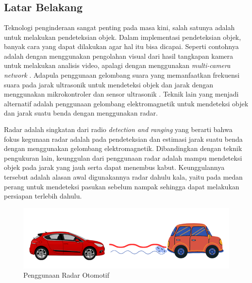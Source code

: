 \chapter{\babSatu}
\section{Latar Belakang}
Teknologi penginderaan sangat penting pada masa kini, salah satunya adalah untuk melakukan pendeteksian objek. Dalam implementasi pendeteksian objek, banyak cara yang dapat dilakukan agar hal itu bisa dicapai. Seperti contohnya adalah dengan menggunakan pengolahan visual dari hasil tangkapan kamera untuk melakukan analisis video, apalagi dengan menggunakan \textit{multi-camera network} \cite{Zhang2015}. Adapula penggunaan gelombang suara yang memanfaatkan frekuensi suara pada jarak ultrasonik untuk mendeteksi objek dan jarak dengan menggunakan mikrokontroler dan sensor ultrasonik \cite{Biswas2020}. Teknik lain yang menjadi alternatif adalah penggunaan gelombang elektromagnetik untuk mendeteksi objek dan jarak suatu benda dengan menggunakan radar. 

Radar adalah singkatan dari radio \textit{detection and ranging} yang berarti bahwa fokus kegunaan radar adalah pada pendeteksian dan estimasi jarak suatu benda dengan menggunakan gelombang elektromagnetik. Dibandingkan dengan teknik pengukuran lain, keunggulan dari penggunaan radar adalah mampu mendeteksi objek pada jarak yang jauh serta dapat menembus kabut. Keunggulannya tersebut adalah alasan awal digunakannya radar dahulu kala, yaitu  pada medan perang untuk mendeteksi pasukan sebelum nampak sehingga dapat melakukan persiapan terlebih dahulu. 

\begin{figure}
	\begin{center}
		\includegraphics[scale=0.5]{pics/bab1/AplikasiRadar.png} 
		\caption[Penggunaan Radar Otomotif]{Penggunaan Radar Otomotif}
		\label{pic:aplikasiRadarKini}
	\end{center}
\end{figure}

